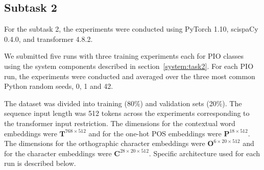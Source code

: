 \documentclass[11pt]{article}
\begin{document}
%
%
%
\subsection{Subtask 2}
\label{exps:task2}
%
For the subtask 2, the experiments were conducted using PyTorch 1.10, scispaCy 0.4.0, and transformer 4.8.2.

We submitted five runs with three training experiments each for PIO classes using the system components described in section~\ref{system:task2}.
For each PIO run, the experiments were conducted and averaged over the three most common Python random seeds, 0, 1 and 42.


The dataset was divided into training (80\%) and validation sets (20\%).
The sequence input length was 512 tokens across the experiments corresponding to the transformer input restriction.
The dimensions for the contextual word embeddings were $\mathbf{T}^{768 \times 512}$ and for the one-hot POS embeddings were $\mathbf{P}^{18 \times 512}$.
The dimensions for the orthographic character embeddings were $\mathbf{O}^{6 \times 20 \times 512}$ and for the character embeddings were $\mathbf{C}^{28 \times 20 \times 512}$.
Specific architecture used for each run is described below.
%
\end{document}

